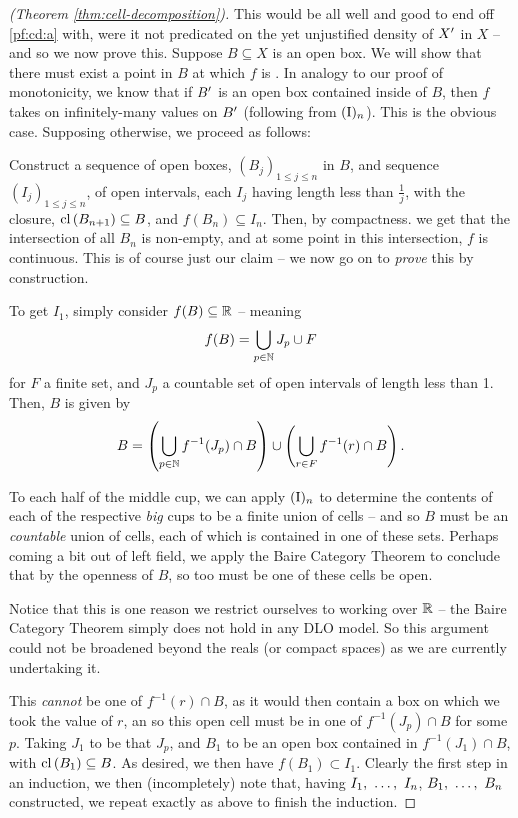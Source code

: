 \begin{proof}[\CD (Theorem \ref{thm:cell-decomposition})]
  This would be all well and good to end off \ref{pf:cd:a} with, were it not predicated on the yet unjustified density of $\Xprime$ in $X$ -- and so we now prove this. Suppose $B \subseteq X$ is an open box. We will show that there must exist a point in $B$ at which $f$ is \cont. In analogy to our proof of monotonicity, we know that if $\Xprime[B]$ is an open box contained inside of $B$, then $f$ takes on infinitely-many values on $\Xprime[B]$ (following from $\In$). This is the obvious case. Supposing otherwise, we proceed as follows:

  Construct a sequence of open boxes, $(B_j)_{1 \leq j \leq n}$ in $B$, and sequence $(I_j)_{1 \leq j \leq n}$, of open intervals, each $I_j$ having length less than $\frac{1}{j}$, with the closure, $\cl{B_{n+1}} \subseteq B$, and $f(B_n) \subseteq I_n$. Then, by compactness. we get that the intersection of all $B_n$ is non-empty, and at some point in this intersection, $f$ is continuous. This is of course just our claim -- we now go on to \emph{prove} this by construction.

  To get $I_1$, simply consider $f(B) \subseteq \R$ -- meaning
  \begin{align*}
    f(B) = \bigcup_{p \in \N} J_p \cup F
  \end{align*}
  for $F$ a finite set, and $J_p$ a countable set of open intervals of length less than 1. Then, $B$ is given by
  \begin{align*}
    B = \left( \bigcup_{p \in \N} f^{-1}(J_p) \cap B \right) \cup \left( \bigcup_{r \in F} f^{-1}(r) \cap B \right).
  \end{align*}

  To each half of the middle cup, we can apply $\In$ to determine the contents of each of the respective \emph{big} cups to be a finite union of cells -- and so $B$ must be an \emph{countable} union of cells, each of which is contained in one of these sets. Perhaps coming a bit out of left field, we apply the Baire Category Theorem to conclude that by the openness of $B$, so too must be one of these cells be open.
  \begin{svgraybox}
    Notice that this is one reason we restrict ourselves to working over $\R$ -- the Baire Category Theorem simply does not hold in any DLO model. So this argument could not be broadened beyond the reals (or compact spaces) as we are currently undertaking it.
  \end{svgraybox}
  This \emph{cannot} be one of $f^{-1}(r) \cap B$, as it would then contain a box on which we took the value of $r$, an so this open cell must be in one of $f^{-1}(J_p) \cap B$ for some $p$. Taking $J_1$ to be that $J_p$, and $B_1$ to be an open box contained in $f^{-1}(J_1) \cap B$, with $\cl{B_1} \subseteq B$. As desired, we then have $f(B_1) \subset I_1$. Clearly the first step in an induction, we then (incompletely) note that, having $\vonevm{I}{n}$, $\vonevm{B}{n}$ constructed, we repeat exactly as above to finish the induction.


\end{proof}
